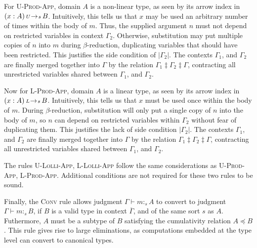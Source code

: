 \documentclass{article}
\theoremstyle{definition}
\newcommand{\rname}[1]{\textsc{\footnotesize #1}}
\newcommand{\pure}[1]{|#1|}
\newcommand{\stype}[1]{:_#1}
\newcommand{\mrg}[3]{#1\ddagger#2\ddagger#3}
\newcommand{\arw}[2]
{\hspace*{0.2em}{\scriptstyle #1}\hspace*{-0.2em}
\rightarrow
\hspace*{-0.2em}{\scriptstyle #2}\hspace*{0.2em}}
\begin{document}
  For \rname{U-Prod-App}, domain $A$ is a non-linear type, as seen by its arrow index in $(x : A) \arw{U}{s} B$. Intuitively, this tells us that $x$ may be used an arbitrary number of times within the body of $m$. Thus, the supplied argument $n$ must not depend on restricted variables in context $\Gamma_2$. Otherwise, substitution may put multiple copies of $n$ into $m$ during $\beta$-reduction, duplicating variables that should have been restricted. This justifies the side condition of $\pure{\Gamma_2}$. The contexts $\Gamma_1$, and $\Gamma_2$ are finally merged together into $\Gamma$ by the relation $\mrg{\Gamma_1}{\Gamma_2}{\Gamma}$, contracting all unrestricted variables shared between $\Gamma_1$, and $\Gamma_2$.
  
  Now for \rname{L-Prod-App}, domain $A$ is a linear type, as seen by its arrow index in $(x : A) \arw{L}{s} B$. Intuitively, this tells us that $x$ must be used once within the body of $m$. During $\beta$-reduction, substitution will only put a single copy of $n$ into the body of $m$, so $n$ can depend on restricted variables within $\Gamma_2$ without fear of duplicating them. This justifies the lack of side condition $\pure{\Gamma_2}$. The contexts $\Gamma_1$, and $\Gamma_2$ are finally merged together into $\Gamma$ by the relation $\mrg{\Gamma_1}{\Gamma_2}{\Gamma}$, contracting all unrestricted variables shared between $\Gamma_1$, and $\Gamma_2$.

  The rules \rname{U-Lolli-App}, \rname{L-Lolli-App} follow the same considerations as \rname{U-Prod-App}, \rname{L-Prod-App}. Additional conditions are not required for these two rules to be sound.

  Finally, the \rname{Conv} rule allows judgment $\Gamma \vdash m \stype{s} A$ to convert to judgment $\Gamma \vdash m \stype{s} B$, if $B$ is a valid type in context $\overline{\Gamma}$, and of the same sort $s$ as $A$. Futhermore, $A$ must be a subtype of $B$ satisfying the cumulativity relation $A \preceq B$. This rule gives rise to large eliminations, as computations embedded at the type level can convert to canonical types.
\end{document}

